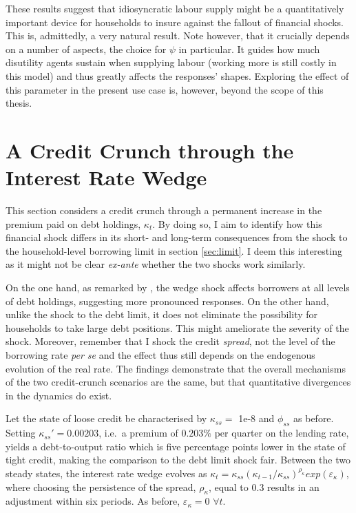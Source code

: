\documentclass[a4paper,12pt]{article} %
\numberwithin{equation}{section} %
\numberwithin{figure}{section}
\numberwithin{table}{section}
\begin{document}
These results suggest that idiosyncratic labour supply might be a quantitatively important device for households to insure against the fallout of financial shocks. This is, admittedly, a very natural result. Note however, that it crucially depends on a number of aspects, the choice for $\psi$ in particular. It guides how much disutility agents sustain when supplying labour (working more is still costly in this model) and thus greatly affects the responses' shapes. Exploring the effect of this parameter in the present use case is, however, beyond the scope of this thesis.

\section{A Credit Crunch through the Interest Rate Wedge}
\label{sec:wedge}

This section considers a credit crunch through a permanent increase in the premium paid on debt holdings, $\kappa_t$. By doing so, I aim to identify how this financial shock differs in its short- and long-term consequences from the shock to the household-level borrowing limit in section \ref{sec:limit}. I deem this interesting as it might not be clear \textit{ex-ante} whether the two shocks work similarly.

On the one hand, as remarked by \textcite{gl2017}, the wedge shock affects borrowers at all levels of debt holdings, suggesting more pronounced responses. On the other hand, unlike the shock to the debt limit, it does not eliminate the possibility for households to take large debt positions. This might ameliorate the severity of the shock. Moreover, remember that I shock the credit \textit{spread}, not the level of the borrowing rate \textit{per se} and the effect thus still depends on the endogenous evolution of the real rate. The findings demonstrate that the overall mechanisms of the two credit-crunch scenarios are the same, but that quantitative divergences in the dynamics do exist. 

Let the state of loose credit be characterised by $\kappa_{ss} =$ 1e-8 and $\phi_{ss}$ as before. Setting $\kappa_{ss}' = 0.00203$, i.e.~a premium of $0.203\%$ per quarter on the lending rate, yields a debt-to-output ratio which is five percentage points lower in the state of tight credit, making the comparison to the debt limit shock fair. Between the two steady states, the interest rate wedge evolves as $\kappa_t = \kappa_{ss} ( \kappa_{t-1} / \kappa_{ss} )^{\rho_{\kappa}} exp(\varepsilon_{\kappa})$, where choosing the persistence of the spread, $\rho_{\kappa}$, equal to $0.3$ results in an adjustment within six periods. As before, $\varepsilon_{\kappa} = 0$ $\forall t$.
\end{document}
